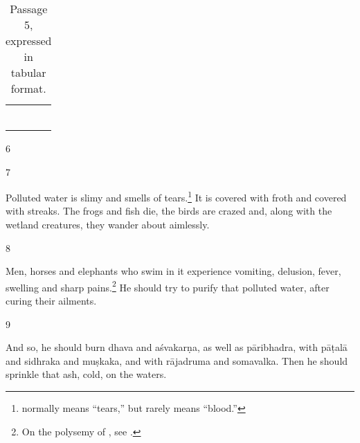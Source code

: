 \begin{translation}
{\begin{longtable}{
        >{\raggedright\arraybackslash}p{}
        >{\raggedright\arraybackslash}p{}}
%                                                
        &  \\[2ex]
%
        &  \\[2ex]
%
        &  \\[2ex]
%
        &  \\[2ex]
%
        &  \\
    \bottomrule
    \caption{Passage 5, expressed in tabular format.}
\end{longtable}
\par} %


    
    \item [6]
    
    \item[7]
    
    Polluted water is slimy and smells of tears.\footnote{ normally
means “tears,” but rarely means “blood.” }  It is covered with froth and
covered with streaks. The frogs and fish die, the birds are crazed and, along with
the wetland creatures, they wander about aimlessly.
    
     \item [8]
     
     Men, horses and elephants who swim in it experience vomiting, delusion,
fever, swelling and sharp pains.\footnote{On the polysemy of , see \cite{seme-1979}.} 
    He should try to purify that polluted water, after curing their ailments.
     
\item [9]

And so, he should burn
    \gls{dhava}  and 
    \gls{aśvakarṇa}, %
        as well as
    \gls{pāribhadra}, %
        with
    \gls{pāṭalā} %
        and 
    \gls{sidhraka} %
        and 
   \gls{muṣkaka}, %
        and with
    \gls{rājadruma} %
        and 
    \gls{somavalka}.
Then he should sprinkle that ash, cold, on the waters.


\end{translation}
